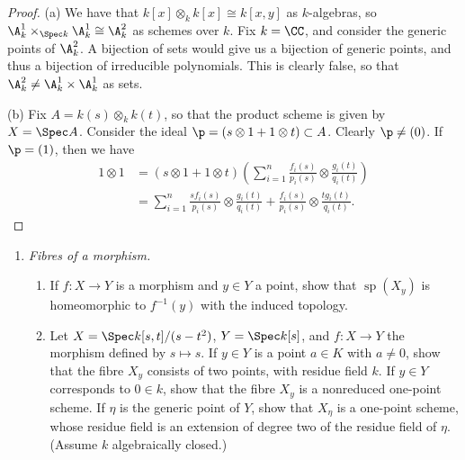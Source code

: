\documentclass[12pt]{amsart}
\DeclareMathOperator{\ssp}{sp}
\begin{document}
\begin{proof}
  (a) We have that $k[x]\otimes_k k[x]\cong k[x,y]$ as $k$-algebras, so $\A_k^1\times_{\Spec k}\A_k^1\cong \A_k^2$ as schemes over $k$.
  Fix $k=\CC$, and consider the generic points of $\A_k^2$.
  A bijection of sets would give us a bijection of generic points, and thus a bijection of irreducible polynomials.
  This is clearly false, so that $\A_k^2\neq \A_k^1\times \A_k^1$ as sets.

  (b) Fix $A=k(s)\otimes_k k(t)$, so that the product scheme is given by $X=\Spec A$.
  Consider the ideal $\p=(s\otimes 1 +1\otimes t)\subset A$.
  Clearly $\p\neq (0)$.
  If $\p=(1)$, then we have
  \begin{align*}
    1\otimes 1 &= (s\otimes 1 + 1\otimes t)\left(\sum_{i=1}^n \frac{f_i(s)}{p_i(s)}\otimes \frac{g_i(t)}{q_i(t)}\right) \\
      &= \sum_{i=1}^n\frac{sf_i(s)}{p_i(s)}\otimes \frac{g_i(t)}{q_i(t)} +
      \frac{f_i(s)}{p_i(s)}\otimes \frac{tg_i(t)}{q_i(t)}.
  \end{align*}
\end{proof}

\begin{enumerate}
	\item[3.10.] {
      \emph{Fibres of a morphism.}
      \begin{enumerate}
        \item If $f:X\to Y$ is a morphism and $y\in Y$ a point, show that $\ssp(X_y)$ is homeomorphic to $f^{-1}(y)$ with the induced topology.
        \item Let $X=\Spec k[s,t]/(s-t^2)$, $Y=\Spec k[s]$, and $f:X\to Y$ the morphism defined by $s\mapsto s$.
          If $y\in Y$ is a point $a\in K$ with $a\neq 0$, show that the fibre $X_y$ consists of two points, with residue field $k$.
          If $y\in Y$ corresponds to $0\in k$, show that the fibre $X_y$ is a nonreduced one-point scheme.
          If $\eta$ is the generic point of $Y$, show that $X_\eta$ is a one-point scheme, whose residue field is an extension of degree two of the residue field of $\eta$. (Assume $k$ algebraically closed.)
      \end{enumerate}
    }
\end{enumerate}
\end{document}
